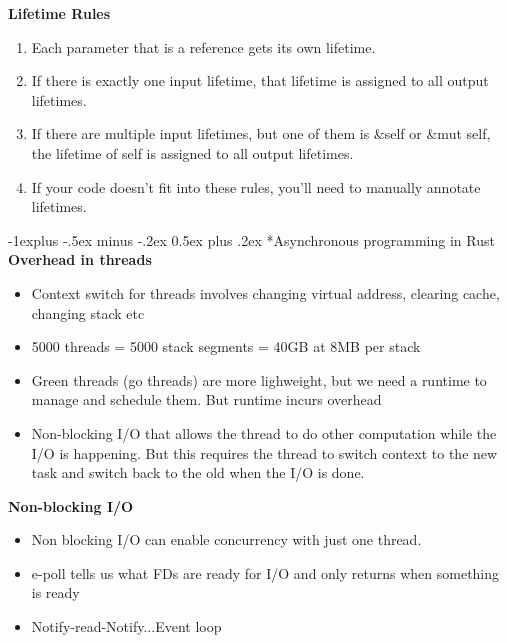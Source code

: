 \documentclass[10pt, landscape]{article}
\makeatletter
\renewcommand{\subsection}{\@startsection{subsection}{2}{0mm}%
                                {-1explus -.5ex minus -.2ex}%
                                {0.5ex plus .2ex}%
                                {\normalfont\normalsize\bfseries}}
\makeatother
\begin{document}
\begin{multicols}{4}
\textbf{Lifetime Rules}\\
\begin{enumerate}
    \item Each parameter that is a reference gets its own lifetime.
    \item If there is exactly one input lifetime, that lifetime is assigned to all output lifetimes.
    \item If there are multiple input lifetimes, but one of them is \&self or \&mut self, the lifetime of self is assigned to all output lifetimes.
    \item If your code doesn't fit into these rules, you'll need to manually annotate lifetimes.
\end{enumerate}

\subsection*{Asynchronous programming in Rust}
\textbf{Overhead in threads} \\
\begin{itemize}
    \item Context switch for threads involves changing virtual address, clearing cache, changing stack etc 
    \item 5000 threads = 5000 stack segments = 40GB at 8MB per stack
    \item Green threads (go threads) are more lighweight, but we need a runtime to manage and schedule them. But runtime incurs overhead
    \item Non-blocking I/O that allows the thread to do other computation while the I/O is happening. But this requires the thread to switch context to the new task and switch back to the old when the I/O is done.
\end{itemize}

\textbf{Non-blocking I/O} \\
\begin{itemize}
    \item Non blocking I/O can enable concurrency with just one thread.
    \item e-poll tells us what FDs are ready for I/O and only returns when something is ready 
    \item Notify-read-Notify...Event loop
\end{itemize}



\end{multicols}
\end{document}
